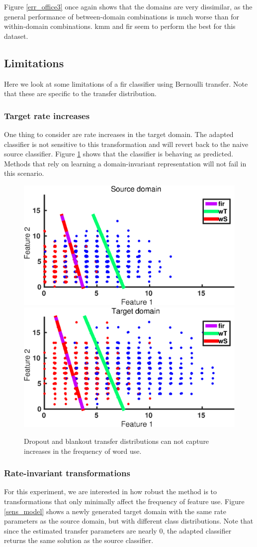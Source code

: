 \documentclass[twoside,11pt]{article}
\begin{document}
Figure \ref{err_office3} once again shows that the domains are very dissimilar, as the general performance of between-domain combinations is much worse than for within-domain combinations. {\sc kmm} and {\sc fir} seem to perform the best for this dataset.

\subsection{Limitations}
Here we look at some limitations of a {\sc fir} classifier using Bernoulli transfer. Note that these are specific to the transfer distribution.

\subsubsection{Target rate increases}
One thing to consider are rate increases in the target domain. The adapted classifier is not sensitive to this transformation and will revert back to the naive source classifier. Figure \ref{sens_rateinc} shows that the classifier is behaving as predicted. Methods that rely on learning a domain-invariant representation will not fail in this scenario.

\begin{figure}[ht]
	\centering
	\includegraphics[width=.45\textwidth]{images/da_artexp_rateinc_Poisson_s.eps}
	\includegraphics[width=.45\textwidth]{images/da_artexp_rateinc_Poisson_t.eps}
	\caption{Dropout and blankout transfer distributions can not capture increases in the frequency of word use.}
	\label{sens_rateinc}
\end{figure}

\subsubsection{Rate-invariant transformations}
For this experiment, we are interested in how robust the method is to transformations that only minimally affect the frequency of feature use. Figure \ref{sens_model} shows a newly generated target domain with the same rate parameters as the source domain, but with different class distributions. Note that since the estimated transfer parameters are nearly 0, the adapted classifier returns the same solution as the source classifier.
\end{document}
